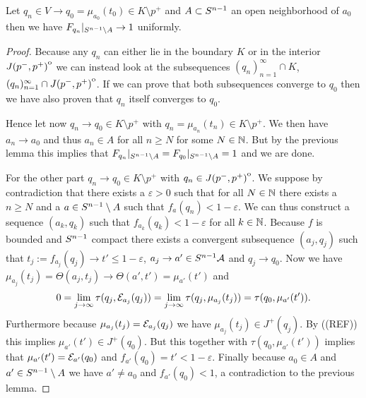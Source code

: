 \begin{lemma}\label{lem:convto1}
    Let $q_n\in V\to q_0=\mu_{a_0}(t_0)\in K\setminus{p^+}$ and $A\subset {S^{n-1}}$ an open neighborhood of $a_0$ then we have $F_{q_n}\rvert_{{S^{n-1}}\setminus A} \to 1$ uniformly.
\end{lemma}
\begin{proof}
    Because any $q_n$ can either lie in the boundary $K$ or in the interior ${\kern0ptJ(p^-,p^+)}^{\mathrm{o}}$ we can instead look at the subsequences $(q_n)_{n=1}^\infty \cap K$, $(q_n)_{n=1}^\infty \cap {\kern0ptJ(p^-,p^+)}^{\mathrm{o}}$. If we can prove that both subsequences converge to $q_0$ then we have also proven that $q_n$ itself converges to $q_0$. 

    Hence let now $q_n \to q_0\in K\setminus p^+$ with $q_n=\mu_{a_n}(t_n) \in K\setminus p^+$. We then have $a_n\to a_0$ and thus $a_n \in A$ for all $n\ge N$ for some $N\in \mathbb{N}$. But by the previous lemma this implies that $F_{q_n}\rvert_{{S^{n-1}}\setminus A} = F_{q_0}\rvert_{{S^{n-1}}\setminus A} = 1$ and we are done.

    For the other part $q_n \to q_0\in K\setminus p^+$ with $q_n \in {\kern0ptJ(p^-,p^+)}^{\mathrm{o}}$.
    We suppose by contradiction that there exists a $\varepsilon>0$ such that for all $N\in \mathbb{N}$ there exists a $n\ge N$ and a $a\in {S^{n-1}}\setminus A$ such that $f_a(q_n)<1-\varepsilon$. We can thus construct a sequence $(a_k, q_k)$ such that $f_{a_k}(q_k)<1-\varepsilon$ for all $k\in \mathbb{N}$. Because $f$ is bounded and ${S^{n-1}}$ compact there exists a convergent subsequence $(a_j,q_j)$ such that $t_j:=f_{a_j}(q_j)\to t'\leq 1-\varepsilon$, $a_j \to a'\in {S^{n-1}}\mathcal{A}$ and $q_j\to q_0$. Now we have $\mu_{a_j}(t_j) = \Theta(a_j,t_j) \to \Theta(a',t')=\mu_{a'}(t')$ and 
    \[
        0 = \lim_{j\to \infty}\tau(q_j,{\mathcal{E}}_{a_j}(q_j)) = \lim_{j\to \infty}\tau(q_j,\mu_{a_j}(t_j)) = \tau(q_0,\mu_{a'}(t')).
    \]
    Furthermore because $\mu_{a_j}(t_j)={\mathcal{E}}_{a_j}(q_j)$ we have $\mu_{a_j}(t_j)\in J^+(q_j)$. By ((REF)) this implies $\mu_{a'}(t')\in J^+(q_0)$. But this together with $\tau(q_0,\mu_{a'}(t'))$ implies that $\mu_{a'}(t')={\mathcal{E}}_{a'}(q_0)$ and $f_{a'}(q_0)=t'<1-\varepsilon$. Finally because $a_0\in A$ and $a'\in {S^{n-1}}\setminus A$ we have $a'\neq a_0$ and $f_{a'}(q_0) <  1$, a contradiction to the previous lemma.
\end{proof}

